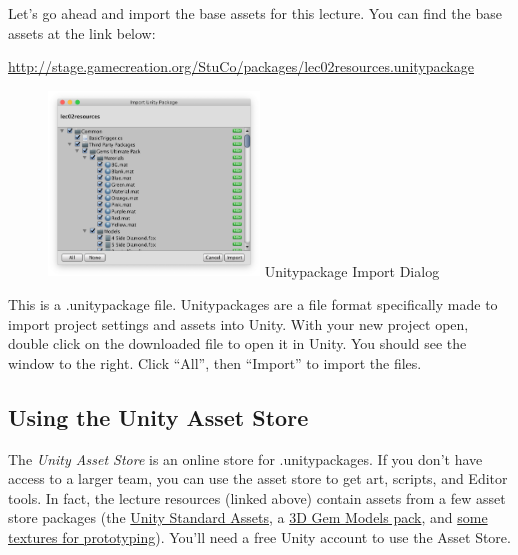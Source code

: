 \documentclass[11pt]{article}
\begin{document}
Let's go ahead and import the base assets for this lecture.  You can find the base assets at the link below:
\begin{center}
\href{http://stage.gamecreation.org/StuCo/packages/lec02resources.unitypackage}{http://stage.gamecreation.org/StuCo/packages/lec02resources.unitypackage}
\end{center}

\pagebreak

\begin{figure}
    \centering
    \includegraphics[width=0.5\textwidth]{import-diag}
    Unitypackage Import Dialog
\end{figure}

This is a .unitypackage file.  Unitypackages are a file format specifically made to import project settings and assets into Unity.  With your new project open, double click on the downloaded file to open it in Unity.  You should see the window to the right.  Click ``All'', then ``Import'' to import the files.

\subsection{Using the Unity Asset Store}

The \textit{Unity Asset Store} is an online store for .unitypackages.  If you don't have access to a larger team, you can use the asset store to get art, scripts, and Editor tools.  In fact, the lecture resources (linked above) contain assets from a few asset store packages (the \href{https://assetstore.unity.com/packages/essentials/asset-packs/standard-assets-32351}{Unity Standard Assets}, a \href{https://assetstore.unity.com/packages/3d/props/3d-crystal-gems-pack-112381}{3D Gem Models pack}, and \href{https://assetstore.unity.com/packages/2d/textures-materials/gridbox-prototype-materials-129127}{some textures for prototyping}).  You'll need a free Unity account to use the Asset Store.
\end{document}
